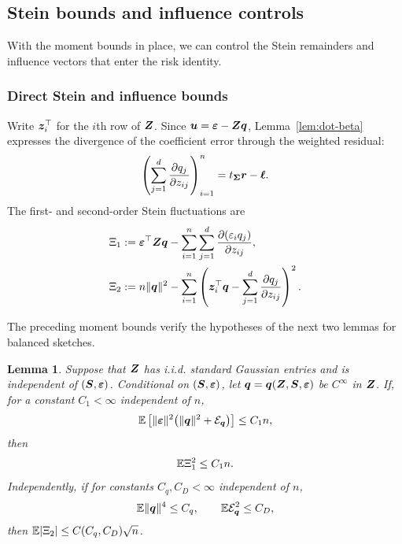 \documentclass{article}
\theoremstyle{plain} %
\newtheorem{lemma}[theorem]{Lemma}
\theoremstyle{definition} %
\theoremstyle{definition} %
\begin{document}
\subsection{Stein bounds and influence controls}

With the moment bounds in place, we can control the Stein remainders and
influence vectors that enter the risk identity.

\subsubsection{Direct Stein and influence bounds}
\label{app:stein-auxiliary-results}

Write $\boldsymbol{z}_i^\top$ for the $i$th row of $\boldsymbol{Z}$. Since
$\boldsymbol{u}={\boldsymbol{\varepsilon} }-\boldsymbol{Z}\boldsymbol{q}$, Lemma~\ref{lem:dot-beta} expresses the divergence
of the coefficient error through the weighted residual:
\begin{align}
    \left(\sum_{j=1}^d\pdv{q_j}{z_{ij}}\right)_{i=1}^n
    =t_{\boldsymbol{\Sigma}}\boldsymbol{r}-\boldsymbol{\ell}.
    \label{eq:whitened-divergence}
\end{align}
The first- and second-order Stein fluctuations are
\begin{align*}
    \Xi_1
    &:={\boldsymbol{\varepsilon} }^\top\boldsymbol{Z}\boldsymbol{q}
       -\sum_{i=1}^n\sum_{j=1}^d
          \pdv{(\varepsilon_i q_j)}{z_{ij}},\\
    \Xi_2
    &:=n\lVert\boldsymbol{q}\rVert^2
       -\sum_{i=1}^n\left(
          \boldsymbol{z}_i^\top\boldsymbol{q}-\sum_{j=1}^d\pdv{q_j}{z_{ij}}
       \right)^2.
\end{align*}

The preceding moment bounds verify the hypotheses of the next two lemmas
for balanced sketches.

\begin{lemma}
\label{lem:Stein-remainders-from-moments}
Suppose that $\boldsymbol{Z}$ has i.i.d. standard Gaussian entries and is independent of
$(\boldsymbol{S},{\boldsymbol{\varepsilon} })$. Conditional on $(\boldsymbol{S},{\boldsymbol{\varepsilon} })$, let
$\boldsymbol{q}=\boldsymbol{q}(\boldsymbol{Z},\boldsymbol{S},{\boldsymbol{\varepsilon} })$ be $C^\infty$ in $\boldsymbol{Z}$.  If, for a constant $C_1<\infty$ independent of $n$,
\begin{align*}
    {\mathbb{E}}\left[\lVert{\boldsymbol{\varepsilon} }\rVert^2
       \bigl(\lVert\boldsymbol{q}\rVert^2+{\mathcal E}_{\boldsymbol{q}}\bigr)\right]
       \leq C_1n,
\end{align*}
then
\begin{align*}
    {\mathbb{E}}\Xi_1^2\leq C_1n.
\end{align*}
Independently, if for constants $C_q,C_D<\infty$ independent of $n$,
\begin{align*}
    {\mathbb{E}}\lVert\boldsymbol{q}\rVert^4\leq C_q,
    \qquad
    {\mathbb{E}}{\mathcal E}_{\boldsymbol{q}}^2\leq C_D,
\end{align*}
then ${\mathbb{E}}|\Xi_2|\leq C(C_q,C_D)\sqrt n$.
\end{lemma}
\end{document}
